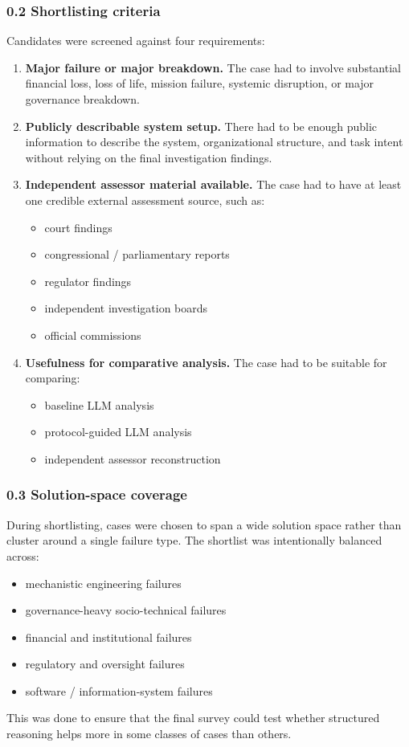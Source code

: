 \subsubsection*{0.2 Shortlisting criteria}
Candidates were screened against four requirements:
\begin{enumerate}
  \item \textbf{Major failure or major breakdown.} The case had to involve substantial financial loss, loss of life,
        mission failure, systemic disruption, or major governance breakdown.
  \item \textbf{Publicly describable system setup.} There had to be enough public information to describe the system,
        organizational structure, and task intent without relying on the final investigation findings.
  \item \textbf{Independent assessor material available.} The case had to have at least one credible external assessment source,
        such as:
        \begin{itemize}
          \item court findings
          \item congressional / parliamentary reports
          \item regulator findings
          \item independent investigation boards
          \item official commissions
        \end{itemize}
  \item \textbf{Usefulness for comparative analysis.} The case had to be suitable for comparing:
        \begin{itemize}
          \item baseline LLM analysis
          \item protocol-guided LLM analysis
          \item independent assessor reconstruction
        \end{itemize}
\end{enumerate}

\subsubsection*{0.3 Solution-space coverage}
During shortlisting, cases were chosen to span a wide solution space rather than cluster around a single failure type.
The shortlist was intentionally balanced across:
\begin{itemize}
  \item mechanistic engineering failures
  \item governance-heavy socio-technical failures
  \item financial and institutional failures
  \item regulatory and oversight failures
  \item software / information-system failures
\end{itemize}
This was done to ensure that the final survey could test whether structured reasoning helps more in some classes of cases
than others.

